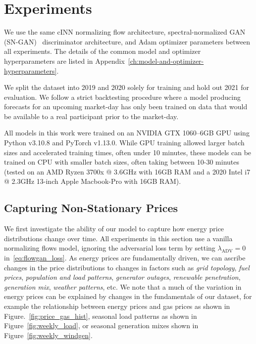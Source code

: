 \chapter{Experiments}\label{ch:experiments}

We use the same cINN normalizing flow architecture, spectral-normalized GAN (SN-GAN)~\cite{sngan} discriminator architecture, and
Adam optimizer parameters between all experiments.
The details of the common model and optimizer hyperparameters are listed in Appendix~\ref{ch:model-and-optimizer-hyperparameters}.

We split the dataset into 2019 and 2020 solely for training and hold out 2021 for evaluation.
We follow a strict backtesting procedure where a model producing forecasts for an upcoming market-day has only been
trained on data that would be available to a real participant prior to the market-day.

All models in this work were trained on an NVIDIA GTX 1060--6GB GPU using Python v3.10.8 and PyTorch v1.13.0.
While GPU training allowed larger batch sizes and accelerated training times, often under 10 minutes, these
models can be trained on CPU with smaller batch sizes, often taking between 10-30 minutes (tested on an AMD
Ryzen 3700x @ 3.6GHz with 16GB RAM and a 2020 Intel i7 @ 2.3GHz 13-inch Apple Macbook-Pro with 16GB RAM).

\section{Capturing Non-Stationary Prices}\label{sec:capturing-non-stationary-prices}

We first investigate the ability of our model to capture how energy price distributions change over time.
All experiments in this section use a vanilla normalizing flows model, ignoring the adversarial loss term by setting
$\lambda_{\text{ADV}} = 0$ in~\eqref{eq:flowgan_loss}.
As energy prices are fundamentally driven, we can ascribe changes in the price distributions to changes in factors such
as \textit{grid topology}, \textit{fuel prices}, \textit{population and load patterns}, \textit{generator outages},
\textit{renewable penetration}, \textit{generation mix}, \textit{weather patterns}, etc.
We note that a much of the variation in energy prices can be explained by changes in the fundamentals of our dataset,
for example the relationship between energy prices and gas prices as shown in Figure.~\ref{fig:price_gas_hist},
seasonal load patterns as shown in Figure~\ref{fig:weekly_load}, or seasonal generation mixes shown in
Figure~\ref{fig:weekly_windgen}.

